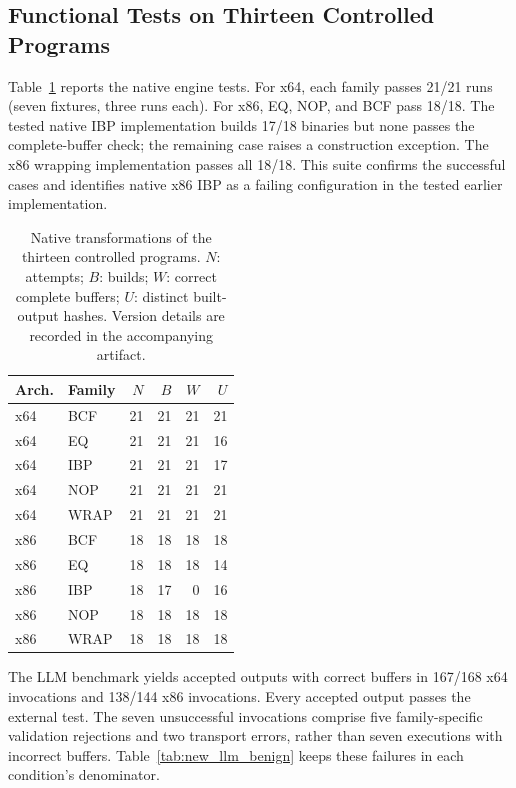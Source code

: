 \subsection{Functional Tests on Thirteen Controlled Programs}
Table~\ref{tab:new_native} reports the native engine tests. For x64, each
family passes 21/21 runs (seven fixtures, three runs each). For x86, EQ,
NOP, and BCF pass 18/18. The tested native IBP implementation builds 17/18 binaries but none passes the
complete-buffer check; the remaining case raises a construction exception.
The x86 wrapping implementation passes all 18/18. This suite confirms the successful cases and identifies native x86
IBP as a failing configuration in the tested earlier implementation.


\begin{table}[t]
\caption{Native transformations of the thirteen controlled programs. $N$: attempts; $B$: builds;
$W$: correct complete buffers; $U$: distinct built-output hashes.
Version details are recorded in the accompanying artifact.}
\label{tab:new_native}
\centering\small
\begin{tabular}{@{}llrrrr@{}}
\toprule
Arch. & Family & $N$ & $B$ & $W$ & $U$ \\
\midrule
x64 & BCF & 21 & 21 & 21 & 21 \\
x64 & EQ & 21 & 21 & 21 & 16 \\
x64 & IBP & 21 & 21 & 21 & 17 \\
x64 & NOP & 21 & 21 & 21 & 21 \\
x64 & WRAP & 21 & 21 & 21 & 21 \\
x86 & BCF & 18 & 18 & 18 & 18 \\
x86 & EQ & 18 & 18 & 18 & 14 \\
x86 & IBP & 18 & 17 & 0 & 16 \\
x86 & NOP & 18 & 18 & 18 & 18 \\
x86 & WRAP & 18 & 18 & 18 & 18 \\
\bottomrule
\end{tabular}
\end{table}


The LLM benchmark yields accepted outputs with correct buffers in 167/168
x64 invocations and 138/144 x86 invocations. Every accepted output passes
the external test. The seven unsuccessful invocations comprise five
family-specific validation rejections and two transport errors, rather
than seven executions with incorrect buffers. Table~\ref{tab:new_llm_benign}
keeps these failures in each condition's denominator.


